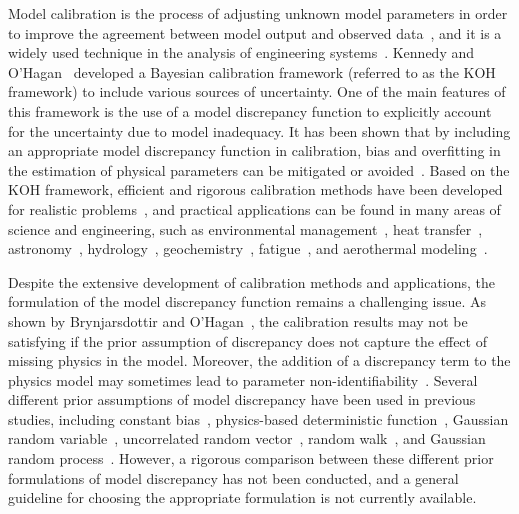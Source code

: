 \documentclass[preprint,review,12pt,3p]{elsarticle}
\begin{document}
Model calibration is the process of adjusting unknown model parameters in order to improve the agreement between model output and observed data~\citep{Campbell2006}, and it is a widely used technique in the analysis of engineering systems~\citep{McFarland2008}. Kennedy and O'Hagan~\citep{Kennedy2001a} developed a Bayesian calibration framework (referred to as the KOH framework) to include various sources of uncertainty. One of the main features of this framework is the use of a model discrepancy function to explicitly account for the uncertainty due to model inadequacy. It has been shown that by including an appropriate model discrepancy function in calibration, bias and overfitting in the estimation of physical parameters can be mitigated or avoided~\citep{Brynjarsdottir2013}. Based on the KOH framework, efficient and rigorous calibration methods have been developed for realistic problems~\citep{Higdon2008,Koutsourelakis2009,Arendt2012,Ling2013a}, and practical applications can be found in many areas of science and engineering, such as environmental management~\citep{Arhonditsis2008}, heat transfer~\citep{McFarland2008a}, astronomy~\citep{Bower2010}, hydrology~\citep{Renard2010}, geochemistry~\citep{Sarkar2012}, fatigue~\citep{Sankararaman2011}, and aerothermal modeling~\citep{DeCarlo2013}. 

Despite the extensive development of calibration methods and applications, the formulation of the model discrepancy function remains a challenging issue. As shown by Brynjarsdottir and O'Hagan~\citep{Brynjarsdottir2013}, the calibration results may not be satisfying if the prior assumption of discrepancy does not capture the effect of missing physics in the model. Moreover, the addition of a discrepancy term to the physics model may sometimes lead to parameter non-identifiability~\citep{Renard2010,Arendt2012,Ling2013a}. Several different prior assumptions of model discrepancy have been used in previous studies, including constant bias~\citep{Arhonditsis2008}, physics-based deterministic function~\citep{DeCarlo2013}, Gaussian random variable~\citep{Renard2010,Sankararaman2011,Sarkar2012,Koutsourelakis2009,Park2010,Riley2011}, uncorrelated random vector~\citep{Bower2010}, random walk~\citep{Arhonditsis2008}, and Gaussian random process~\citep{McFarland2008a,Higdon2008,Arendt2012}. However, a rigorous comparison between these different prior formulations of model discrepancy has not been conducted, and a general guideline for choosing the appropriate formulation is not currently available. 
 
\end{document}
